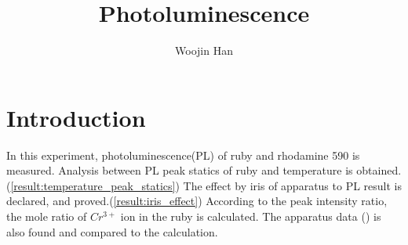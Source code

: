 \documentclass{article}
\begin{document}
\title{Photoluminescence}
\author[1]{Woojin Han}
\maketitle
\begin{abstract}

\end{abstract}

\section{Introduction}
 In this experiment, photoluminescence(PL) of ruby and rhodamine 590 is measured.
 Analysis between PL peak statics of ruby and temperature is obtained.(\ref{result:temperature_peak_statics})
 The effect by iris of apparatus to PL result is declared, and proved.(\ref{result:iris_effect})
 According to the peak intensity ratio, the mole ratio of $Cr^{3+}$ ion in the ruby is calculated.
 The apparatus data (\cite{ruby_spec}) is also found and compared to the calculation.
\end{document}
